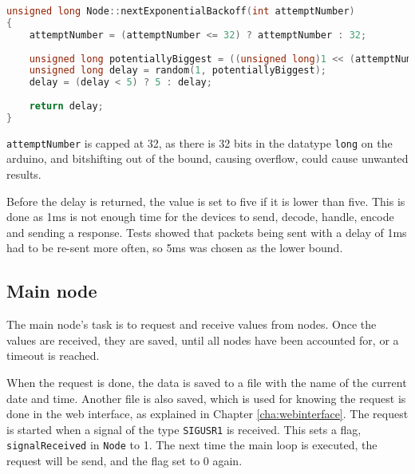 \begin{lstlisting}[language=C,caption={Exponential backoff on the sensor nodes. In Node.cpp.},label={lst:expbackoff}]
unsigned long Node::nextExponentialBackoff(int attemptNumber)
{
    attemptNumber = (attemptNumber <= 32) ? attemptNumber : 32;
    
    unsigned long potentiallyBiggest = ((unsigned long)1 << (attemptNumber - 1));
    unsigned long delay = random(1, potentiallyBiggest);
    delay = (delay < 5) ? 5 : delay;
    
    return delay;
}
\end{lstlisting}
\texttt{attemptNumber} is capped at 32, as there is 32 bits in the datatype \texttt{long} on the arduino, and bitshifting out of the bound, causing overflow, could cause unwanted results.

Before the delay is returned, the value is set to five if it is lower than five. This is done as 1ms is not enough time for the devices to send, decode, handle, encode and sending a response. Tests showed that packets being sent with a delay of 1ms had to be re-sent more often, so 5ms was chosen as the lower bound.

\subsection{Main node} \label{cha:signalhandling}
The main node's task is to request and receive values from nodes. Once the values are received, they are saved, until all nodes have been accounted for, or a timeout is reached.

When the request is done, the data is saved to a file with the name of the current date and time. Another file is also saved, which is used for knowing the request is done in the web interface, as explained in Chapter \ref{cha:webinterface}. The request is started when a signal of the type \texttt{SIGUSR1} is received. This sets a flag, \texttt{signalReceived} in \texttt{Node} to 1. The next time the main loop is executed, the request will be send, and the flag set to 0 again.
